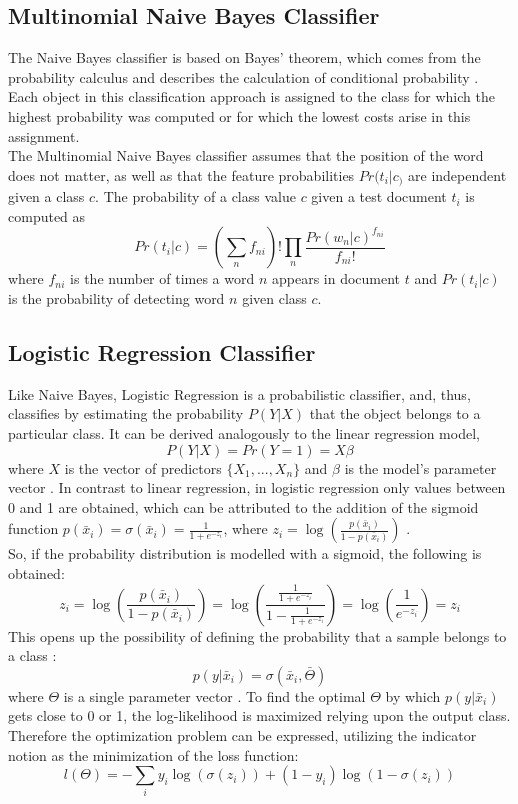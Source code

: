 \documentclass[a4paper, 11pt,titlepage,oneside,openany]{book}
\begin{document}
\subsection{Multinomial Naive Bayes Classifier}
The Naive Bayes classifier is based on  Bayes' theorem, which comes from the probability calculus and describes the calculation of conditional probability \cite{btheory}. Each object in this classification approach is assigned to the class for which the highest probability was computed or for which the lowest costs arise in this assignment.  \\
\noindent The Multinomial Naive Bayes classifier assumes that the position of the word does not matter, as well as  that the feature probabilities $Pr(t_i|c_)$ are independent given a class $c$.
The probability of a class value $c$ given a test document $t_i$ is computed as \cite{multinomialnb}
\[
Pr(t_i|c)=(\sum_{n}f_{ni})!\prod_{n}\frac{Pr(w_n|c)^{f_{ni}}}{f_{ni}!}
\]
where $f_{ni}$ is the number of times a word $n$ appears in document $t$ and $Pr(t_i|c)$ is the probability of detecting word $n$ given class $c$.
\newpage
\subsection{Logistic Regression Classifier}
\noindent Like Naive Bayes, Logistic Regression is a probabilistic classifier, and, thus, classifies by estimating the probability $P(Y|X)$ that the object belongs to a particular class.
It can be derived analogously to the linear regression model, 
\[
P(Y|X)=Pr(Y=1)=X\beta
\]
where $X$ is the vector of predictors $\{X_1,...,X_n\}$ and $\beta$ is the model's parameter vector \cite{logisticregressionbook}. In contrast to linear regression, in logistic regression only values between 0 and 1 are obtained, which can be attributed to the addition of the sigmoid function $p(\bar{x}_i)=\sigma(\bar{x}_i)=\frac{1}{1+e^{-z_i}}$, where $z_i=\log(\frac{p(\bar{x}_i)}{1-p(\bar{x}_i)})$ \cite{algorithms2}. \\
So, if the probability distribution is modelled with a sigmoid, the following is obtained:
\[
z_i=\log(\frac{p(\bar{x}_i)}{1-p(\bar{x}_i)})=\log(\frac{\frac{1}{1+e^{-z_i}}}{1-\frac{1}{1+e^{-z_i}}})=\log(\frac{1}{e^{-z_i}})=z_i
\]
This opens up the possibility of defining the probability that a sample belongs to a class \cite{algorithms2}:
\[
p(y|\bar{x}_i)=\sigma(\bar{x}_i,\bar{\Theta})
\]
where $\Theta$ is a single parameter vector \cite{algorithms2}.
\noindent To find the optimal $\Theta$ by which $p(y|\bar{x}_i)$ gets close to 0 or 1, the log-likelihood is maximized relying upon the output class. Therefore the optimization problem can be expressed, utilizing the indicator notion as the minimization of the loss function:
\[
l(\Theta)=-\sum_{i}y_i\log(\sigma(z_i))+(1-y_i)\log(1-\sigma(z_i))
\]
\end{document}
